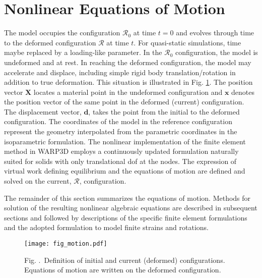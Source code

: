 \documentclass[11pt]{report}
\numberwithin{equation}{section}
\renewcommand{\thefigure}{\thesection.\arabic{figure}}
\begin{document}
\section{Nonlinear Equations of Motion}
\noindent 
The model occupies the configuration $\mathcal{R}_0$  at time $t=0$ and  
evolves through time to the deformed configuration $\mathcal{R}$ at time $t$.  
For quasi-static simulations, time 
maybe replaced by a loading-like parameter.
In the $\mathcal{R}_0$ configuration, the model is undeformed and at rest. 
In reaching the deformed configuration, the model may accelerate and displace, 
including simple rigid body translation/rotation in addition to true deformation. 
This situation is illustrated in Fig. \ref{fig:motion}. The position vector $\bm{X}$ locates
a material point in 
the undeformed configuration and $\bm{x}$ denotes the position vector of the same point 
in the deformed (current) configuration. The displacement vector, $\bm{d}$, 
takes the point from the initial to the deformed configuration. The coordinates 
of the model in the reference configuration represent the  geometry interpolated 
from the parametric coordinates in the isoparametric formulation. The nonlinear 
implementation of the finite element method in WARP3D employs a continuously 
updated formulation naturally suited for solids with only translational dof at the nodes. 
The expression of virtual work defining equilibrium and the equations of motion are 
defined and solved on the current, $\mathcal{R}$, configuration. 

The remainder of this section summarizes the equations of motion. 
Methods for solution of the resulting nonlinear algebraic equations are described 
in subsequent sections and followed by descriptions of the specific finite element 
formulations and the adopted formulation to model finite strains and rotations.

%
\begin{figure}[h]
\begin{center}
\texttt{[image: fig\_motion.pdf]} 
\caption{{\small Fig. \thefigure\ Definition of initial and current (deformed) configurations.
Equations of motion are written on the deformed configuration.}
\label{fig:motion}}
%
\end{center}
\end{figure}
%
\end{document}
